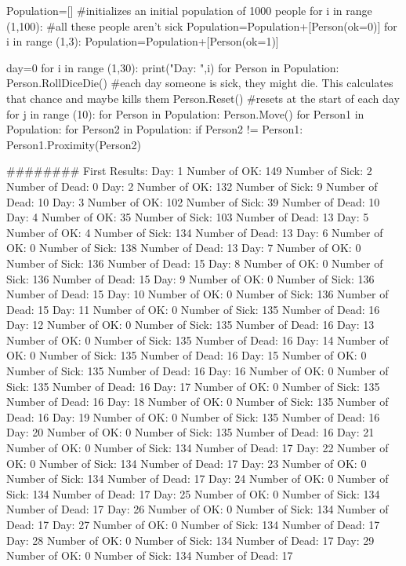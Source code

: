                     
                
Population=[] #initializes an initial population of 1000 people
for i in range (1,100): #all these people aren't sick
    Population=Population+[Person(ok=0)]
for i in range (1,3):
    Population=Population+[Person(ok=1)]
    
day=0
for i in range (1,30):
    print("Day: {}",i)
    for Person in Population:
        Person.RollDiceDie() #each day someone is sick, they might die. This calculates that chance and maybe kills them
        Person.Reset() #resets at the start of each day
    for j in range (10):
        for Person in Population:
            Person.Move()
        for Person1 in Population:
            for Person2 in Population:
                if Person2 != Person1:
                    Person1.Proximity(Person2)
            
        
        



        
        
######## First Results:
Day: 1
Number of OK: 149
Number of Sick: 2
Number of Dead: 0
Day: 2
Number of OK: 132
Number of Sick: 9
Number of Dead: 10
Day: 3
Number of OK: 102
Number of Sick: 39
Number of Dead: 10
Day: 4
Number of OK: 35
Number of Sick: 103
Number of Dead: 13
Day: 5
Number of OK: 4
Number of Sick: 134
Number of Dead: 13
Day: 6
Number of OK: 0
Number of Sick: 138
Number of Dead: 13
Day: 7
Number of OK: 0
Number of Sick: 136
Number of Dead: 15
Day: 8
Number of OK: 0
Number of Sick: 136
Number of Dead: 15
Day: 9
Number of OK: 0
Number of Sick: 136
Number of Dead: 15
Day: 10
Number of OK: 0
Number of Sick: 136
Number of Dead: 15
Day: 11
Number of OK: 0
Number of Sick: 135
Number of Dead: 16
Day: 12
Number of OK: 0
Number of Sick: 135
Number of Dead: 16
Day: 13
Number of OK: 0
Number of Sick: 135
Number of Dead: 16
Day: 14
Number of OK: 0
Number of Sick: 135
Number of Dead: 16
Day: 15
Number of OK: 0
Number of Sick: 135
Number of Dead: 16
Day: 16
Number of OK: 0
Number of Sick: 135
Number of Dead: 16
Day: 17
Number of OK: 0
Number of Sick: 135
Number of Dead: 16
Day: 18
Number of OK: 0
Number of Sick: 135
Number of Dead: 16
Day: 19
Number of OK: 0
Number of Sick: 135
Number of Dead: 16
Day: 20
Number of OK: 0
Number of Sick: 135
Number of Dead: 16
Day: 21
Number of OK: 0
Number of Sick: 134
Number of Dead: 17
Day: 22
Number of OK: 0
Number of Sick: 134
Number of Dead: 17
Day: 23
Number of OK: 0
Number of Sick: 134
Number of Dead: 17
Day: 24
Number of OK: 0
Number of Sick: 134
Number of Dead: 17
Day: 25
Number of OK: 0
Number of Sick: 134
Number of Dead: 17
Day: 26
Number of OK: 0
Number of Sick: 134
Number of Dead: 17
Day: 27
Number of OK: 0
Number of Sick: 134
Number of Dead: 17
Day: 28
Number of OK: 0
Number of Sick: 134
Number of Dead: 17
Day: 29
Number of OK: 0
Number of Sick: 134
Number of Dead: 17